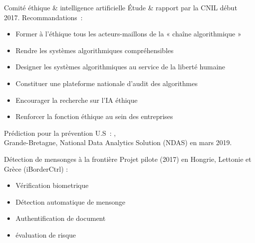 
\begin{frame}{Comité éthique \& intelligence artificielle}
  Étude \& rapport par la CNIL début 2017. Recommandations~:
  \begin{itemize}[<+->]
    \item Former à l’éthique tous les acteurs-maillons de la « chaîne algorithmique » 
    \item Rendre les systèmes algorithmiques compréhensibles
    \item Designer les systèmes algorithmiques au service de la liberté humaine
    \item Constituer une plateforme nationale d’audit des algorithmes
    \item Encourager la recherche sur l’IA éthique
    \item Renforcer la fonction éthique au sein des entreprises
  \end{itemize}
\end{frame}

\begin{frame}{Prédiction pour la prévention}
  U.S~: , \\
  Grande-Bretagne, National Data Analytics Solution (NDAS) en mars 2019.
\end{frame}

\begin{frame}{Détection de mensonges à la frontière}
  Projet pilote (2017) en Hongrie, Lettonie et Grèce (iBorderCtrl) :
  \begin{itemize}
    \item Vérification biometrique
    \item Détection automatique de mensonge
    \item Authentification de document 
    \item évaluation de risque
  \end{itemize}
\end{frame}


